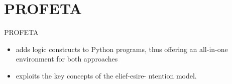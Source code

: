 \section{PROFETA}
\begin{frame}[label=3]{PROFETA}  
\begin{itemize}
   \item 
    adds logic constructs to Python programs, thus 
    offering an all-in-one environment for both approaches
    \N
  \item
     exploits the key concepts of the elief-esire- ntention model.
  \end{itemize}
  \N\N
\end{frame}





%
%
%



















